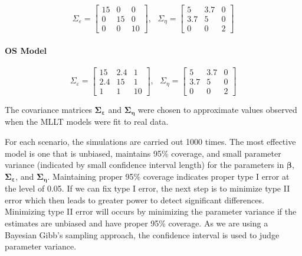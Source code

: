 \documentclass[
]{article}
\begin{document}
\begin{equation}\label{eq:S}
\Sigma_\varepsilon = 
\begin{bmatrix}
15 & 0 & 0\\
0 & 15 & 0\\
0 & 0 & 10
\end{bmatrix}, \ \ \ 
\Sigma_\eta =
\begin{bmatrix}
5 & 3.7 & 0\\
3.7 & 5 & 0\\
0 & 0 & 2
\end{bmatrix}
\end{equation}

\hypertarget{os-model}{%
\paragraph{OS Model}\label{os-model}}

\begin{equation}\label{eq:OS}
\Sigma_\varepsilon = 
\begin{bmatrix}
15 & 2.4 & 1\\
2.4 & 15 & 1\\
1 & 1 & 10
\end{bmatrix}, \ \ \ 
\Sigma_\eta =
\begin{bmatrix}
5 & 3.7 & 0\\
3.7 & 5 & 0\\
0 & 0 & 2
\end{bmatrix}
\end{equation}

The covariance matrices \(\boldsymbol{\Sigma_\varepsilon}\) and \(\boldsymbol{\Sigma_\eta}\) were chosen to approximate values observed when the MLLT models were fit to real data.

For each scenario, the simulations are carried out 1000 times. The most effective model is one that is unbiased, maintains 95\% coverage, and small parameter variance (indicated by small confidence interval length) for the parameters in \(\boldsymbol{\beta}\), \(\boldsymbol{\Sigma_\varepsilon}\), and \(\boldsymbol{\Sigma_\eta}\). Maintaining proper 95\% coverage indicates proper type I error at the level of 0.05. If we can fix type I error, the next step is to minimize type II error which then leads to greater power to detect significant differences. Minimizing type II error will occurs by minimizing the parameter variance if the estimates are unbiased and have proper 95\% coverage. As we are using a Bayesian Gibb's sampling approach, the confidence interval is used to judge parameter variance.
\end{document}
